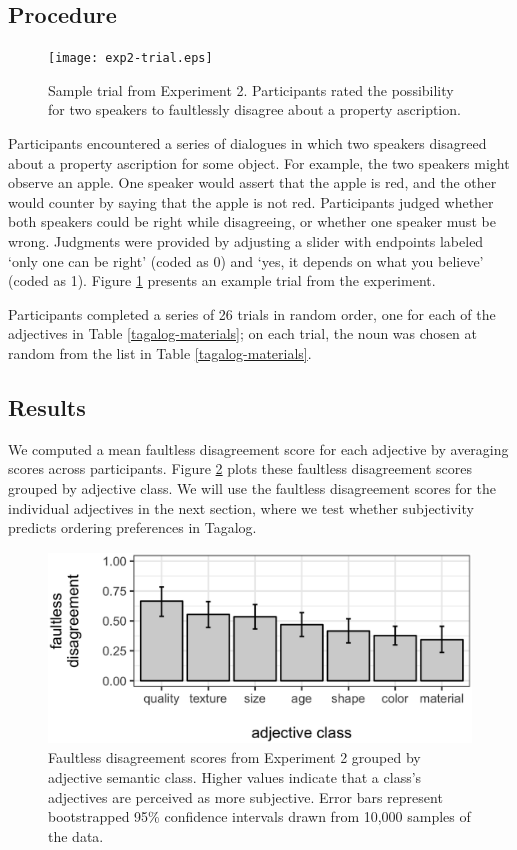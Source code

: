 \documentclass[12pt,letterpaper]{article}
\begin{document}
\subsection{Procedure}

\begin{figure}[t]
	\centering
	\texttt{[image: exp2-trial.eps]}
	\caption{Sample trial from Experiment 2. Participants rated the possibility for two speakers to faultlessly disagree about a property ascription.
	}
	\label{exp2-trial}
\end{figure}

Participants encountered a series of dialogues in which two speakers disagreed about a property ascription for some object. For example, the two speakers might observe an apple. One speaker would assert that the apple is red, and the other would counter by saying that the apple is not red. Participants judged whether both speakers could be right while disagreeing, or whether one speaker must be wrong. Judgments were provided by adjusting a slider with endpoints labeled `only one can be right' (coded as 0) and `yes, it depends on what you believe' (coded as 1). Figure \ref{exp2-trial} presents an example trial from the experiment.

Participants completed a series of 26 trials in random order, one for each of the adjectives in Table \ref{tagalog-materials}; on each trial, the noun was chosen at random from the list in Table \ref{tagalog-materials}.

\subsection{Results}

We computed a mean faultless disagreement score for each adjective by averaging scores across participants. Figure \ref{exp2-results} plots these faultless disagreement scores grouped by adjective class. We will use the faultless disagreement scores for the individual adjectives in the next section, where we test whether subjectivity predicts ordering preferences in Tagalog.

\begin{figure}[t]
	\centering
	\includegraphics[height=2in]{class_faultless.eps}
	\caption{Faultless disagreement scores from Experiment 2 grouped by adjective semantic class. Higher values indicate that a class's adjectives are perceived as more subjective. Error bars represent bootstrapped 95\% confidence intervals drawn from 10,000 samples of the data.
	}
	\label{exp2-results}
\end{figure}
\end{document}
